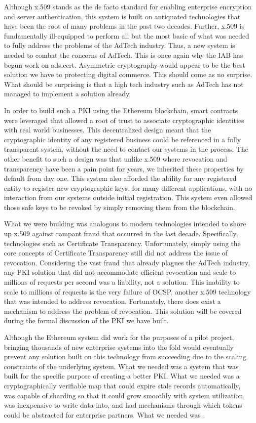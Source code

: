 Although x.509 stands as the de facto standard for enabling enterprise
encryption and server authentication, this system is built on
antiquated technologies that have been the root of many problems in the
past two decades.
Further, x.509 is fundamentally ill-equipped to perform all but the
most basic of what was needed to fully address the problems of the
AdTech industry.
Thus, a new system is needed to combat the concerns of AdTech.
This is once again why the IAB has begun work on ads.cert.
Asymmetric cryptography would appear to be the best solution we have to
protecting digital commerce.
This should come as no surprise.
What should be surprising is that a high tech industry such as AdTech
has not managed to implement a solution already.

In order to build such a PKI using the Ethereum blockchain, smart
contracts were leveraged that allowed a root of trust to associate
cryptographic identities with real world businesses.
This decentralized design meant that the cryptographic identity of any
registered business could be referenced in a fully transparent system,
without the need to contact our systems in the process.
The other benefit to such a design was that unlike x.509 where
revocation and transparency have been a pain point for years, we
inherited these properties by default from day one.
This system also afforded the ability for any registered entity to
register new cryptographic keys, for many different applications, with
no interaction from our systems outside initial registration.
This system even allowed those safe keys to be revoked by simply
removing them from the blockchain.

What we were building was analogous to modern technologies intended to
shore up x.509 against rampant fraud that occurred in the last decade.
Specifically, technologies such as Certificate Transparency.
Unfortunately, simply using the core concepts of Certificate
Transparency still did not address the issue of revocation.
Considering the vast fraud that already plagues the AdTech industry,
any PKI solution that did not accommodate efficient revocation and
scale to millions of requests per second was a liability, not a
solution.
This inability to scale to millions of requests is the very failure of
OCSP, another x.509 technology that was intended to address revocation.
Fortunately, there does exist a mechanism to address the problem of
revocation.
This solution will be covered during the formal discussion of the PKI
we have built.

Although the Ethereum system did work for the purposes of a pilot
project, bringing thousands of new enterprise systems into the fold
would eventually prevent any solution built on this technology from
succeeding due to the scaling constraints of the underlying system.
What we needed was a system that was built for the specific purpose of
creating a better PKI.
What we needed was a cryptographically verifiable map that could expire
stale records automatically, was capable of sharding so that it could
grow smoothly with system utilization, was inexpensive to write data
into, and had mechanisms through which tokens could be abstracted for
enterprise partners.
What we needed was \LayerTwoLong{}.


